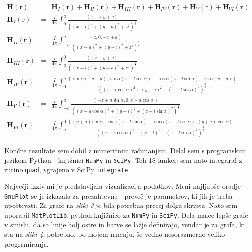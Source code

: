 \documentclass[12pt, a4paper]{article}
\begin{document}
\begin{eqnarray}
\mathbf{H}(\mathbf{r}) & = & \mathbf{H}_I(\mathbf{r}) + \mathbf{H}_{II}(\mathbf{r}) + \mathbf{H}_{III}(\mathbf{r}) + \mathbf{H}_{IV}(\mathbf{r}) + \mathbf{H}_{V}(\mathbf{r}) + \mathbf{H}_{VI}(\mathbf{r})  \nonumber \\
\mathbf{H}_I(\mathbf{r})& = & \frac{I}{4\pi}\int_0^a\frac{(0, -z, y+a)}{((x-l)^2 + (y+a)^2 + z^2)^{\frac{3}{2}}}\nonumber \\
\mathbf{H}_{II}(\mathbf{r}) & = & \frac{I}{4\pi}\int_{-a}^a\frac{(z, 0, -x+a)}{((x-a)^2 + (y-l)^2 + z^2)^{\frac{3}{2}}}\nonumber \\
\mathbf{H}_{III}(\mathbf{r})& = & \frac{I}{4\pi}\int_{a}^0\frac{(0, z, -y+a)}{((x-l)^2 + (y-a)^2 + z^2)^{\frac{3}{2}}}\nonumber \\
\mathbf{H}_{IV}(\mathbf{r})& = & \frac{I}{4\pi}\int_{0}^a\frac{(\sin{\alpha}(-y +a), \sin{\alpha}(x - l\cos{\alpha}) - \cos{\alpha}(z - l\sin{\alpha}), \cos{\alpha}(y-a))}{((x-l\cos{\alpha})^2 + (y-a)^2 + (z-l\sin{\alpha})^2)^{\frac{3}{2}}}\nonumber \\
\mathbf{H}_{V}(\mathbf{r}) & = & \frac{I}{4\pi}\int_{-a}^a\frac{(-z + a\sin{\alpha}, 0,x -a \cos{\alpha})}{((x-a\cos{\alpha})^2 + (y-l)^2 + (z-l\sin{\alpha})^2)^{\frac{3}{2}}}\nonumber \\
\mathbf{H}_{VI}(\mathbf{r}) & = & \frac{I}{4\pi}\int_{a}^0\frac{((y+a)\sin{\alpha},\cos{\alpha}(z - l\sin{\alpha}) - \sin{\alpha}(x - l\cos{\alpha}) , (y+a)\cos{\alpha})}{((x-a\cos{\alpha})^2 + (y-l)^2 + (z-l\sin{\alpha})^2)^{\frac{3}{2}}}\nonumber
\end{eqnarray}

Končne rezultate sem dobil z numeričnim računanjem. Delal sem s programskim jezikom Python - knjižnici \texttt{NumPy} in \texttt{SciPy}. %
Teh 18 funkcij sem nato integriral z rutino \texttt{quad}, vgrajeno v SciPy \texttt{integrate}.

Največji izziv mi je predstavljala vizualizacija podatkov. Meni najljubše orodje \texttt{GnuPlot} se je izkazalo za prezahtevno - preveč je parametrov, ki jih je treba upoštevati. Za grafe na \textit{sliki 3} je bila potrebna precej dolga skripta. Nato sem uporabil \texttt{MatPlotLib}, python knjižnico za \texttt{NumPy} in \texttt{SciPy}. Dela malce lepše grafe v smislu, da so linije bolj ostre in barve se lažje definirajo, vendar je za grafa, ki sta na \textit{sliki 4}, potrebno, po mojem mnenju, še vedno nesorazmerno veliko programiranja.
\end{document}
